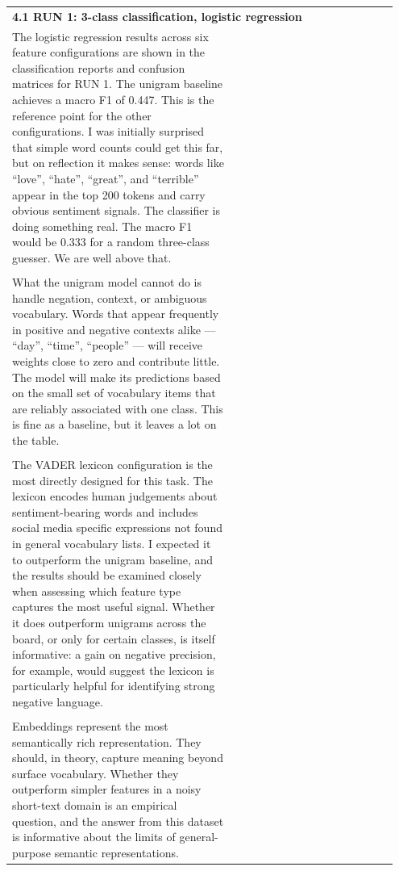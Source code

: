 \documentclass[11pt]{article}
\begin{document}
\begin{longtable}{|p{0.55\linewidth}|p{0.40\linewidth}|}
\hline
\rule{0pt}{3.5cm} & \\
\hline
\multicolumn{2}{|l|}{\textbf{4.1 RUN 1: 3-class classification, logistic regression}} \\[2pt]
\hline
The logistic regression results across six feature configurations are shown in the classification reports and confusion matrices for RUN 1. The unigram baseline achieves a macro F1 of 0.447. This is the reference point for the other configurations. I was initially surprised that simple word counts could get this far, but on reflection it makes sense: words like ``love'', ``hate'', ``great'', and ``terrible'' appear in the top 200 tokens and carry obvious sentiment signals. The classifier is doing something real. The macro F1 would be 0.333 for a random three-class guesser. We are well above that. & \\[2pt]
\hline
\rule{0pt}{3.5cm} & \\
\hline
What the unigram model cannot do is handle negation, context, or ambiguous vocabulary. Words that appear frequently in positive and negative contexts alike --- ``day'', ``time'', ``people'' --- will receive weights close to zero and contribute little. The model will make its predictions based on the small set of vocabulary items that are reliably associated with one class. This is fine as a baseline, but it leaves a lot on the table. & \\[2pt]
\hline
\rule{0pt}{3.5cm} & \\
\hline
The VADER lexicon configuration is the most directly designed for this task. The lexicon encodes human judgements about sentiment-bearing words and includes social media specific expressions not found in general vocabulary lists. I expected it to outperform the unigram baseline, and the results should be examined closely when assessing which feature type captures the most useful signal. Whether it does outperform unigrams across the board, or only for certain classes, is itself informative: a gain on negative precision, for example, would suggest the lexicon is particularly helpful for identifying strong negative language. & \\[2pt]
\hline
\rule{0pt}{3.5cm} & \\
\hline
Embeddings represent the most semantically rich representation. They should, in theory, capture meaning beyond surface vocabulary. Whether they outperform simpler features in a noisy short-text domain is an empirical question, and the answer from this dataset is informative about the limits of general-purpose semantic representations. & \\[2pt]

\end{longtable}
\end{document}
